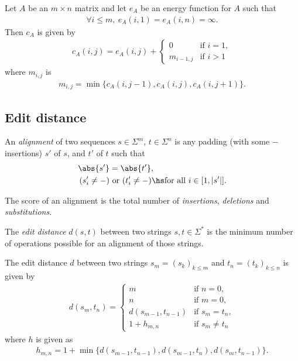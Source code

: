 \documentclass{article}
\begin{document}
\begin{theorem}
	Let $A$ be an $m\times n$ matrix and let $e_A$ be an energy function for
	$A$ such that
	\begin{align*}
		\forall i \leq m,\: e_A(i,1) = e_A(i,n) = \infty.
	\end{align*}
	Then $c_A$ is given by
	\begin{align*}
		c_A(i,j) = e_A(i,j) + \begin{cases}
			0 &\text{if }i=1,\\
			m_{i-1,j} &\text{if }i>1
		\end{cases}
	\end{align*}
	where $m_{i,j}$ is
	\begin{align*}
		m_{i,j} = \min\{c_A(i,j-1), c_A(i,j), c_A(i,j+1)\}.
	\end{align*}
\end{theorem}

\subsection{Edit distance}

\begin{definition}
	An \emph{alignment} of two sequences $s\in\Sigma^m$, $t\in\Sigma^n$ is
	any padding (with some $-$ insertions) $s'$ of $s$, and $t'$ of $t$ such that
	\begin{align*}
		\abs{s'}&=\abs{t'},\\
		(s'_i\not=-)&\text{ or }(t'_i\not=-)\hs\text{for all }i\in[1,|s'|].
	\end{align*}
\end{definition}

\begin{definition}
	The score of an alignment is the total number of \emph{insertions},
	\emph{deletions} and \emph{substitutions}.
\end{definition}

\begin{definition}
	The \emph{edit distance} $d(s,t)$ between two strings $s,t\in\Sigma^*$ is the
	minimum number of operations possible for an alignment of those strings.
\end{definition}

\begin{theorem}
	The edit distance $d$ between two strings $s_m=(s_k)_{k\leq m}$ 
	and $t_n=(t_k)_{k\leq n}$ is given by 
	\begin{align*}
		d(s_m,t_n) = \begin{cases}
			m &\text{if }n=0,\\
			n &\text{if }m=0,\\
			d(s_{m-1}, t_{n-1}) &\text{if }s_m=t_n,\\
			1 + h_{m,n} &\text{if }s_m\not=t_n
		\end{cases}
	\end{align*}
	where $h$ is given as
	\begin{align*}
		h_{m,n}= 1 + \min\{d(s_{m-1},t_{n-1}), d(s_{m-1}, t_n), d(s_m, t_{n-1})\}.	
	\end{align*}
\end{theorem}
\end{document}
